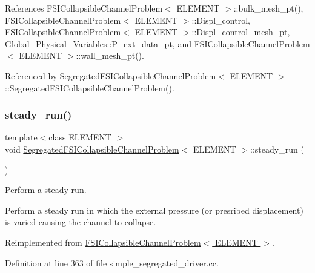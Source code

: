 References F\+S\+I\+Collapsible\+Channel\+Problem$<$ E\+L\+E\+M\+E\+N\+T $>$\+::bulk\+\_\+mesh\+\_\+pt(), F\+S\+I\+Collapsible\+Channel\+Problem$<$ E\+L\+E\+M\+E\+N\+T $>$\+::\+Displ\+\_\+control, F\+S\+I\+Collapsible\+Channel\+Problem$<$ E\+L\+E\+M\+E\+N\+T $>$\+::\+Displ\+\_\+control\+\_\+mesh\+\_\+pt, Global\+\_\+\+Physical\+\_\+\+Variables\+::\+P\+\_\+ext\+\_\+data\+\_\+pt, and F\+S\+I\+Collapsible\+Channel\+Problem$<$ E\+L\+E\+M\+E\+N\+T $>$\+::wall\+\_\+mesh\+\_\+pt().



Referenced by Segregated\+F\+S\+I\+Collapsible\+Channel\+Problem$<$ E\+L\+E\+M\+E\+N\+T $>$\+::\+Segregated\+F\+S\+I\+Collapsible\+Channel\+Problem().

\mbox{\label{classSegregatedFSICollapsibleChannelProblem_a9a6b0dfeda9eb0d4c50e195768c93e37}} 
\subsubsection{\texorpdfstring{steady\+\_\+run()}{steady\_run()}}
{\footnotesize\ttfamily template$<$class E\+L\+E\+M\+E\+NT $>$ \\
void \hyperlink{classSegregatedFSICollapsibleChannelProblem}{Segregated\+F\+S\+I\+Collapsible\+Channel\+Problem}$<$ E\+L\+E\+M\+E\+NT $>$\+::steady\+\_\+run (\begin{DoxyParamCaption}{ }\end{DoxyParamCaption})\hspace{0.3cm}{\ttfamily [virtual]}}



Perform a steady run. 

Perform a steady run in which the external pressure (or presribed displacement) is varied causing the channel to collapse. 

Reimplemented from \hyperlink{classFSICollapsibleChannelProblem_a299ba7d5819e7871eae7e331d1abab8b}{F\+S\+I\+Collapsible\+Channel\+Problem$<$ E\+L\+E\+M\+E\+N\+T $>$}.



Definition at line 363 of file simple\+\_\+segregated\+\_\+driver.\+cc.



